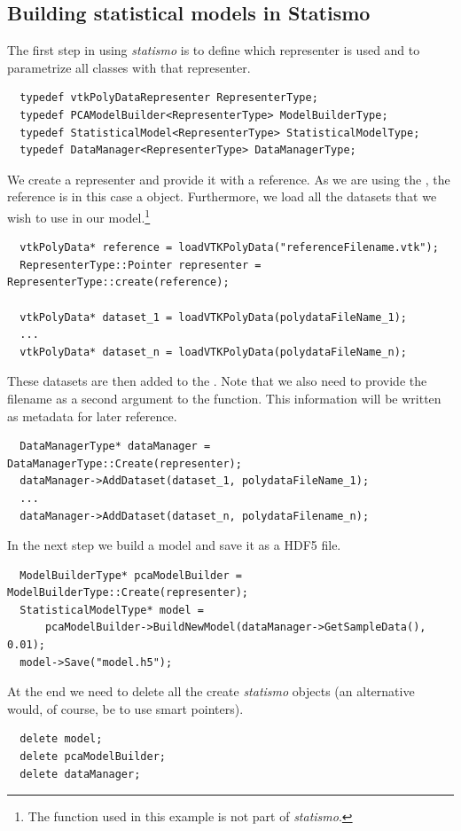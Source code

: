\documentclass{InsightArticle}
\newcommand{\statismo}{\emph{statismo}\xspace}
\begin{document}
\subsection{Building statistical models in Statismo}

The first step in using \statismo is to define which representer is used and to parametrize all classes with that 
representer. 
\begin{verbatim}
  typedef vtkPolyDataRepresenter RepresenterType;
  typedef PCAModelBuilder<RepresenterType> ModelBuilderType;
  typedef StatisticalModel<RepresenterType> StatisticalModelType;
  typedef DataManager<RepresenterType> DataManagerType;
\end{verbatim}

We create a representer and provide it with a reference. As we are
using the , the reference is in this case
a  object.
Furthermore, we load all the datasets that we wish to use in our model.\footnote{
The  function used in this example is not part of \statismo.}
\begin{verbatim}
  vtkPolyData* reference = loadVTKPolyData("referenceFilename.vtk");
  RepresenterType::Pointer representer = RepresenterType::create(reference);

  vtkPolyData* dataset_1 = loadVTKPolyData(polydataFileName_1);
  ... 
  vtkPolyData* dataset_n = loadVTKPolyData(polydataFileName_n);
\end{verbatim}

These datasets are then added to the . Note that we also need to provide the filename as
a second argument to the  function. This information will be written as metadata for later
reference. 

\begin{verbatim}
  DataManagerType* dataManager =  DataManagerType::Create(representer);
  dataManager->AddDataset(dataset_1, polydataFileName_1);
  ...
  dataManager->AddDataset(dataset_n, polydataFilename_n);
\end{verbatim}
In the next step we build a model and save it as a HDF5 file. 
\begin{verbatim}
  ModelBuilderType* pcaModelBuilder = ModelBuilderType::Create(representer);
  StatisticalModelType* model =  
      pcaModelBuilder->BuildNewModel(dataManager->GetSampleData(), 0.01);
  model->Save("model.h5");
\end{verbatim}
At the end we need to delete all the create \statismo objects (an alternative would, of course, be to use
smart pointers).
\begin{verbatim}
  delete model;
  delete pcaModelBuilder;
  delete dataManager;
\end{verbatim}
\end{document}
